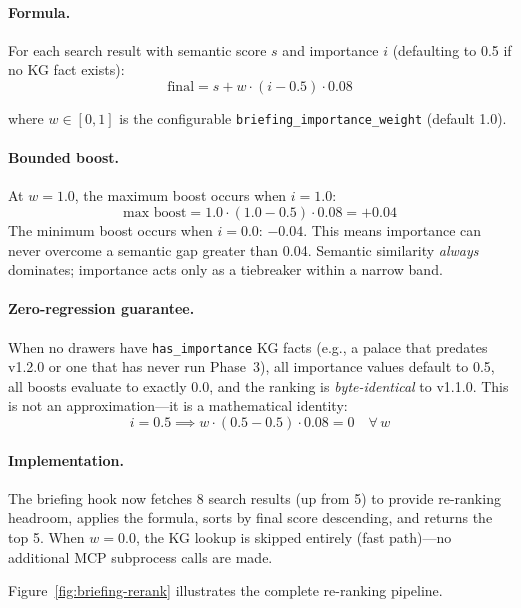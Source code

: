 \documentclass[11pt]{article}
\begin{document}
\paragraph{Formula.}
For each search result with semantic score $s$ and importance $i$ (defaulting to 0.5 if no KG fact exists):
\begin{equation}
    \text{final} = s + w \cdot (i - 0.5) \cdot 0.08
    \label{eq:rerank}
\end{equation}

\noindent where $w \in [0, 1]$ is the configurable
\texttt{briefing\_importance\_weight} (default 1.0).

\paragraph{Bounded boost.}
At $w = 1.0$, the maximum boost occurs when $i = 1.0$:
\begin{equation}
    \text{max boost} = 1.0 \cdot (1.0 - 0.5) \cdot 0.08 = +0.04
\end{equation}
The minimum boost occurs when $i = 0.0$: $-0.04$. This means importance
can never overcome a semantic gap greater than 0.04. Semantic similarity
\emph{always} dominates; importance acts only as a tiebreaker within a
narrow band.

\paragraph{Zero-regression guarantee.}
When no drawers have \texttt{has\_importance} KG facts (e.g., a palace
that predates v1.2.0 or one that has never run Phase~3), all importance
values default to 0.5, all boosts evaluate to exactly 0.0, and the
ranking is \emph{byte-identical} to v1.1.0. This is not an
approximation---it is a mathematical identity:
\begin{equation}
    i = 0.5 \implies w \cdot (0.5 - 0.5) \cdot 0.08 = 0 \quad \forall\, w
\end{equation}

\paragraph{Implementation.}
The briefing hook now fetches 8 search results (up from 5) to provide
re-ranking headroom, applies the formula, sorts by final score
descending, and returns the top 5. When $w = 0.0$, the KG lookup is
skipped entirely (fast path)---no additional MCP subprocess calls are
made.

Figure~\ref{fig:briefing-rerank} illustrates the complete re-ranking pipeline.
\end{document}
